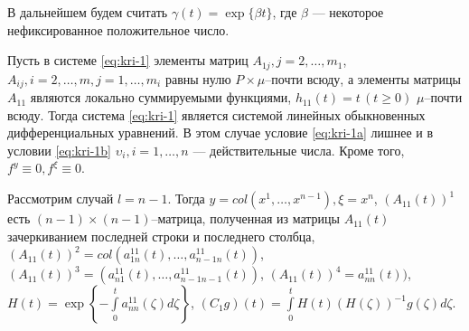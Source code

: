 В дальнейшем будем считать $\gamma (t) = \exp \{\beta t\}$, где
$\beta$ --- некоторое  нефиксированное положительное число.

Пусть в системе \eqref{eq:kri-1} элементы матриц $A_{1j}, j = 2, \dots, m_1$,
$A_{ij}, i = 2, \dots, m, j = 1, \dots, m_i$ равны нулю
$P\times\mu$--почти всюду, а элементы матрицы $A_{11}$ являются
локально суммируемыми функциями, $h_{11}(t) = t \, (t \geq 0)$ $\mu
$--почти всюду. Тогда система \eqref{eq:kri-1} является системой линейных
обыкновенных дифференциальных уравнений. В этом случае условие \eqref{eq:kri-1a}
лишнее и в условии \eqref{eq:kri-1b} $\upsilon_i, i = 1, \dots, n$ ---
действительные числа. Кроме того, $f^y \equiv 0, f^\xi \equiv 0$.


Рассмотрим случай  $l = n-1$. Тогда $y = col(x^1,\dots,x^{n-1}), \xi =
x^n$, $(A_{11}(t))^1$ есть $(n-1)\times (n-1)$--матрица, полученная
из матрицы $A_{11}(t)$ зачеркиванием последней строки и последнего
столбца, $(A_{11}(t))^2 = col(a^{11}_{1n}(t),\dots,a^{11}_{n-1
n}(t))$, $(A_{11}(t))^3 = (a^{11}_{n1}(t),\dots,a^{11}_{n-1n-1}(t))$,
$(A_{11}(t))^4 = a^{11}_{nn}(t))$, $H(t) = \exp \left \{-\int
\limits _{0}^t a^{11}_{nn}(\zeta)d\zeta \right \}$, $(C_1g)(t) =
\int \limits _{0}^tH(t)(H(\zeta))^{-1}g(\zeta)d\zeta$.

